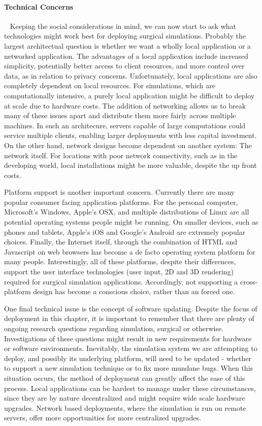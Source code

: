 \paragraph{Technical Concerns}~ Keeping the social considerations
in mind, we can now start to ask what technologies might work best for
deploying surgical simulations. Probably the largest architectual
question is whether we want a wholly local application or a networked
application. The advantages of a local application include increased
simplicity, potentially better access to client resources, and more
control over data, as in relation to privacy concerns. Unfortunately,
local applications are also completely dependent on local
resources. For simulations, which are computationally intensive, a
purely local application might be difficult to deploy at scale due to
hardware costs. The addition of networking allows us to break many of
these issues apart and distribute them more fairly across multiple
machines. In such an architecure, servers capable of large
computations could service multiple clients, enabling larger
deployments with less capital investment. On the other hand, network
designs become dependent on another system: The network itself. For
locations with poor network connectivity, such as in the developing
world, local installations might be more valuable, despite the up
front costs.

Platform support is another important concern. Currently there are
many popular consumer facing application platforms. For the personal
computer, Microsoft's Windows, Apple's OSX, and multiple distributions
of Linux are all potential operating systems people might be
running. On smaller devices, such as phones and tablets, Apple's iOS
and Google's Android are extremely popular choices. Finally, the
Internet itself, through the combination of HTML and Javascript on web
browsers has become a de facto operating system platform for many
people. Interestingly, all of these platforms, despite their
differences, support the user interface technologies (user input, 2D
and 3D rendering) required for surgical simulation
applications. Accordingly, not supporting a cross-platform design
has become a conscious choice, rather than an forced one.

One final technical issue is the concept of software updating. Despite
the focus of deployment in this chapter, it is important to remember
that there are plenty of ongoing research questions regarding
simulation, surgical or otherwise. Investigations of these questions
might result in new requirements for hardware or software
environments. Inevitably, the simulation system we are attempting to
deploy, and possibly its underlying platform, will need to be updated
- whether to support a new simulation technique or to fix more mundane
bugs. When this situation occurs, the method of deployment can greatly
affect the ease of this process. Local applications can be hardest to
manage under these circumstances, since they are by nature
decentralized and might require wide scale hardware upgrades. Network
based deployments, where the simulation is run on remote servers,
offer more opportunities for more centralized upgrades.

